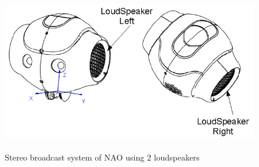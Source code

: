 \begin{figure}
	[h] \centering 
	\includegraphics[height=7cm]{figures/content/nao-audio.jpg} \caption{Stereo broadcast system of NAO using 2 loudspeakers \cite{nao-spec}} \label{fg:nao:audio} 
\end{figure}

